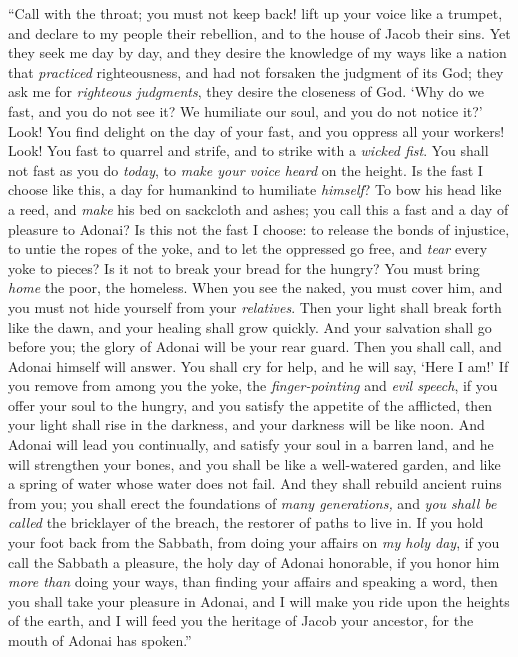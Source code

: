 \begin{biblechapter} %
 “Call with the throat; you must not keep back! 
lift up your voice like a trumpet, 
and declare to my people their rebellion, 
and to the house of Jacob their sins.
\verse Yet they seek me day by day, 
and they desire the knowledge of my ways 
like a nation that \textit{practiced} righteousness, 
and had not forsaken the judgment of its God; 
they ask me for \textit{righteous judgments}, 
they desire the closeness of God.
\verse ‘Why do we fast, and you do not see it? 
We humiliate our soul, and you do not notice it?’ 
Look! You find delight on the day of your fast, 
and you oppress all your workers!
\verse Look! You fast to quarrel and strife, 
and to strike with a \textit{wicked fist}. 
You shall not fast as you do \textit{today}, 
to \textit{make your voice heard} on the height.
\verse Is the fast I choose like this, 
a day for humankind to humiliate \textit{himself}? 
To bow his head like a reed, 
and \textit{make} his bed on sackcloth and ashes; 
you call this a fast 
and a day of pleasure to Adonai?
\verse Is this not the fast I choose: to release the bonds of injustice, 
to untie the ropes of the yoke, 
and to let the oppressed go free, 
and \textit{tear} every yoke to pieces?
\verse Is it not to break your bread for the hungry? 
You must bring \textit{home} the poor, the homeless. 
When you see the naked, you must cover him, 
and you must not hide yourself from your \textit{relatives}.
\verse Then your light shall break forth like the dawn, 
and your healing shall grow quickly. 
And your salvation shall go before you; 
the glory of Adonai will be your rear guard.
\verse Then you shall call, and Adonai himself will answer. 
You shall cry for help, and he will say, ‘Here I am!’ 
If you remove from among you the yoke, 
the \textit{finger-pointing} and \textit{evil speech},
\verse if you offer your soul to the hungry, 
and you satisfy the appetite of the afflicted, 
then your light shall rise in the darkness, 
and your darkness will be like noon.
\verse And Adonai will lead you continually, and satisfy your soul in a barren land, 
and he will strengthen your bones, 
and you shall be like a well-watered garden, 
and like a spring of water whose water does not fail.
\verse And they shall rebuild ancient ruins from you; 
you shall erect the foundations of \textit{many generations,} 
and \textit{you shall be called} the bricklayer of the breach, 
the restorer of paths to live in.
\verse If you hold your foot back from the Sabbath, 
from doing your affairs on \textit{my holy day}, 
if you call the Sabbath a pleasure, 
the holy day of Adonai honorable, 
if you honor him \textit{more than} doing your ways, 
than finding your affairs and speaking a word,
\verse then you shall take your pleasure in Adonai, 
and I will make you ride upon the heights of the earth, 
and I will feed you the heritage of Jacob your ancestor, for the mouth of Adonai has spoken.”
\end{biblechapter}

